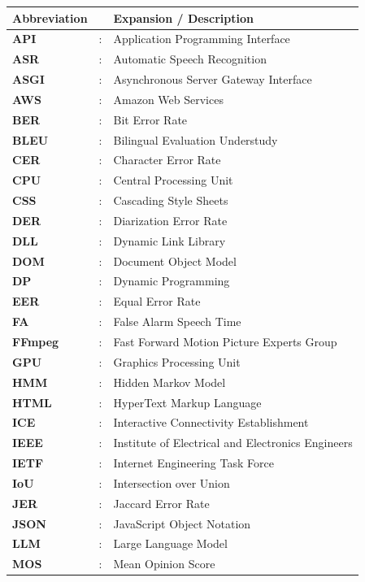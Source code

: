 \documentclass[12pt,oneside,letterpaper]{report}
\numberwithin{equation}{chapter} %
\begin{document}
\noindent\begin{longtable}{p{3.0cm}p{0.5cm}p{10.5cm}}
\textbf{Abbreviation} & & \textbf{Expansion / Description} \\
\midrule
\endhead
\textbf{API} & : & Application Programming Interface \\
\textbf{ASR} & : & Automatic Speech Recognition \\
\textbf{ASGI} & : & Asynchronous Server Gateway Interface \\
\textbf{AWS} & : & Amazon Web Services \\
\textbf{BER} & : & Bit Error Rate \\
\textbf{BLEU} & : & Bilingual Evaluation Understudy \\
\textbf{CER} & : & Character Error Rate \\
\textbf{CPU} & : & Central Processing Unit \\
\textbf{CSS} & : & Cascading Style Sheets \\
\textbf{DER} & : & Diarization Error Rate \\
\textbf{DLL} & : & Dynamic Link Library \\
\textbf{DOM} & : & Document Object Model \\
\textbf{DP} & : & Dynamic Programming \\
\textbf{EER} & : & Equal Error Rate \\
\textbf{FA} & : & False Alarm Speech Time \\
\textbf{FFmpeg} & : & Fast Forward Motion Picture Experts Group \\
\textbf{GPU} & : & Graphics Processing Unit \\
\textbf{HMM} & : & Hidden Markov Model \\
\textbf{HTML} & : & HyperText Markup Language \\
\textbf{ICE} & : & Interactive Connectivity Establishment \\
\textbf{IEEE} & : & Institute of Electrical and Electronics Engineers \\
\textbf{IETF} & : & Internet Engineering Task Force \\
\textbf{IoU} & : & Intersection over Union \\
\textbf{JER} & : & Jaccard Error Rate \\
\textbf{JSON} & : & JavaScript Object Notation \\
\textbf{LLM} & : & Large Language Model \\
\textbf{MOS} & : & Mean Opinion Score \\

\end{longtable}
\end{document}
